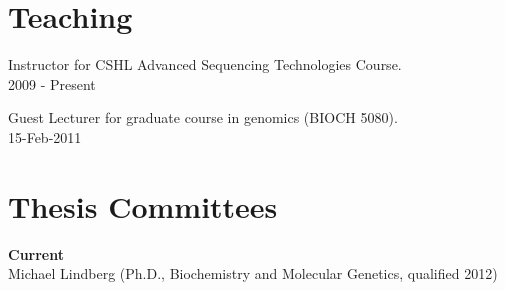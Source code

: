 \documentclass[margin,line]{cv}
\begin{document}
\begin{resume}
    \section{\mysidestyle Teaching}
    Instructor for CSHL Advanced Sequencing Technologies Course.\\
    2009 - Present
    
    \vspace{-2mm}
    Guest Lecturer for graduate course in genomics (BIOCH 5080).\\
    15-Feb-2011
    
    
    
    \section{\mysidestyle Thesis Committees}
    \textbf{Current} \\
    Michael Lindberg (Ph.D., Biochemistry and Molecular Genetics, qualified 2012)
    
    

\end{resume}
\end{document}
